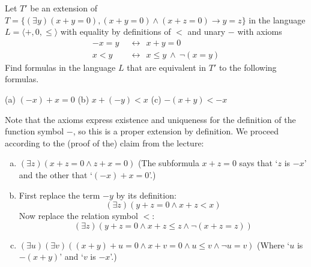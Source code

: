 \begin{problem}

    Let $T'$ be an extension of $T=\{(\exists y)(x+y=0),(x+y=0)\wedge (x+z=0)\rightarrow y=z\}$ in the language $L=\langle +,0,\le\rangle$ with equality by definitions of $<$ and unary $-$ with axioms
    \begin{align*}
        -x=y\ \ &\leftrightarrow\ \ x+y=0\\
        x<y\ \ &\leftrightarrow\ \ x\le y\ \wedge\ \neg(x=y)
    \end{align*}
    Find formulas in the language $L$ that are equivalent in $T'$ to the following formulas.
        
    (a) $(-x)+x=0$ \hfill (b) $x+(-y)<x$ \hfill (c) $-(x+y)<-x$\hfill{}

    \begin{solution}

        Note that the axioms express existence and uniqueness for the definition of the function symbol $-$, so this is a proper extension by definition. We proceed according to the (proof of the) claim from the lecture:
        \begin{enumerate}[(a)]
            \item $(\exists z)(x+z=0\land z+x=0)$ (The subformula $x+z=0$ says that `$z$ is $-x$' and the other that `$(-x)+x=0$'.)
            \item First replace the term $-y$ by its definition:
            $$
            (\exists z)(y+z=0\land x+z<x)
            $$
            Now replace the relation symbol $<$:
            $$
            (\exists z)(y+z=0\land x+z\leq z\land\neg(x+z=z))
            $$
            \item $(\exists u)(\exists v)((x+y)+u=0\land x+v=0\land u\leq v\land \neg u=v)$ (Where `$u$ is $-(x+y)$' and `$v$ is $-x$'.)
        \end{enumerate}
                    
    \end{solution}
    
\end{problem}


